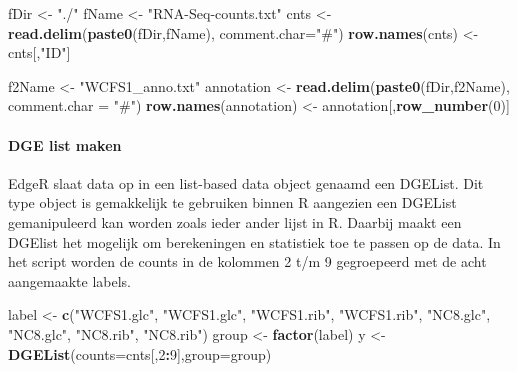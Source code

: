 \documentclass[
]{article}
\newenvironment{Shaded}{\begin{snugshade}}{\end{snugshade}}
\newcommand{\DataTypeTok}[1]{\textcolor[rgb]{0.13,0.29,0.53}{#1}}
\newcommand{\DecValTok}[1]{\textcolor[rgb]{0.00,0.00,0.81}{#1}}
\newcommand{\KeywordTok}[1]{\textcolor[rgb]{0.13,0.29,0.53}{\textbf{#1}}}
\newcommand{\NormalTok}[1]{#1}
\newcommand{\OperatorTok}[1]{\textcolor[rgb]{0.81,0.36,0.00}{\textbf{#1}}}
\newcommand{\StringTok}[1]{\textcolor[rgb]{0.31,0.60,0.02}{#1}}
\begin{document}
\begin{Shaded}
\begin{Highlighting}[]
\NormalTok{fDir <-}\StringTok{ "./"}
\NormalTok{fName <-}\StringTok{ "RNA-Seq-counts.txt"}
\NormalTok{cnts <-}\StringTok{ }\KeywordTok{read.delim}\NormalTok{(}\KeywordTok{paste0}\NormalTok{(fDir,fName), }\DataTypeTok{comment.char=}\StringTok{"#"}\NormalTok{)}
\KeywordTok{row.names}\NormalTok{(cnts) <-}\StringTok{ }\NormalTok{cnts[,}\StringTok{"ID"}\NormalTok{]}

\NormalTok{f2Name <-}\StringTok{ "WCFS1_anno.txt"}
\NormalTok{annotation <-}\StringTok{ }\KeywordTok{read.delim}\NormalTok{(}\KeywordTok{paste0}\NormalTok{(fDir,f2Name), }\DataTypeTok{comment.char =} \StringTok{"#"}\NormalTok{)}
\KeywordTok{row.names}\NormalTok{(annotation) <-}\StringTok{ }\NormalTok{annotation[,}\KeywordTok{row_number}\NormalTok{(}\DecValTok{0}\NormalTok{)]}
\end{Highlighting}
\end{Shaded}

\hypertarget{dge-list-maken}{%
\paragraph{DGE list maken}\label{dge-list-maken}}

EdgeR slaat data op in een list-based data object genaamd een DGEList.
Dit type object is gemakkelijk te gebruiken binnen R aangezien een
DGEList gemanipuleerd kan worden zoals ieder ander lijst in R. Daarbij
maakt een DGElist het mogelijk om berekeningen en statistiek toe te
passen op de data. In het script worden de counts in de kolommen 2 t/m 9
gegroepeerd met de acht aangemaakte labels.

\begin{Shaded}
\begin{Highlighting}[]
\NormalTok{label <-}\StringTok{ }\KeywordTok{c}\NormalTok{(}\StringTok{"WCFS1.glc"}\NormalTok{,  }\StringTok{"WCFS1.glc"}\NormalTok{,   }\StringTok{"WCFS1.rib"}\NormalTok{,    }\StringTok{"WCFS1.rib"}\NormalTok{,    }\StringTok{"NC8.glc"}\NormalTok{,  }\StringTok{"NC8.glc"}\NormalTok{,  }\StringTok{"NC8.rib"}\NormalTok{,  }\StringTok{"NC8.rib"}\NormalTok{)}
\NormalTok{group <-}\StringTok{ }\KeywordTok{factor}\NormalTok{(label)}
\NormalTok{y <-}\StringTok{ }\KeywordTok{DGEList}\NormalTok{(}\DataTypeTok{counts=}\NormalTok{cnts[,}\DecValTok{2}\OperatorTok{:}\DecValTok{9}\NormalTok{],}\DataTypeTok{group=}\NormalTok{group)}
\end{Highlighting}
\end{Shaded}
\end{document}
